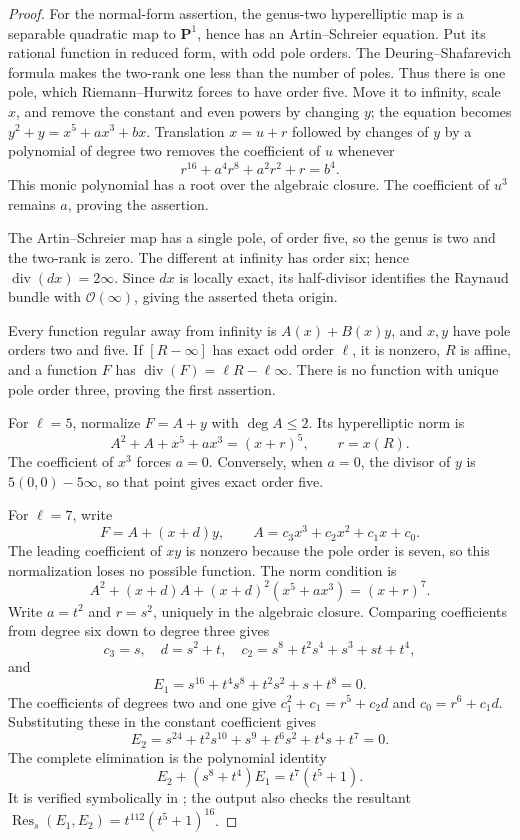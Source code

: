 \begin{proof}
For the normal-form assertion, the genus-two hyperelliptic
map is a separable quadratic map to $\mathbf P^1$, hence
has an Artin--Schreier equation. Put its rational function
in reduced form, with odd pole orders. The
Deuring--Shafarevich formula makes the two-rank one less
than the number of poles. Thus there is one pole, which
Riemann--Hurwitz forces to have order five. Move it to
infinity, scale $x$, and remove the constant and even
powers by changing $y$; the equation becomes
$y^2+y=x^5+a x^3+b x$. Translation $x=u+r$ followed
by changes of $y$ by a polynomial of degree two removes
the coefficient of $u$ whenever
\[
                   r^{16}+a^4r^8+a^2r^2+r=b^4.
\]
This monic polynomial has a root over the algebraic
closure. The coefficient of $u^3$ remains $a$,
proving the assertion.

The Artin--Schreier map has a single pole, of order five,
so the genus is two and the two-rank is zero. The different
at infinity has order six; hence $\operatorname{div}(dx)=2\infty$.
Since $dx$ is locally exact, its half-divisor identifies
the Raynaud bundle with $\mathcal O(\infty)$, giving
the asserted theta origin.

Every function regular away from infinity is
$A(x)+B(x)y$, and $x,y$ have pole orders two and five.
If $[R-\infty]$ has exact odd order $\ell$, it is nonzero,
$R$ is affine, and a function $F$ has
$\operatorname{div}(F)=\ell R-\ell\infty$.
There is no function with unique pole order three, proving
the first assertion.

For $\ell=5$, normalize $F=A+y$ with $\deg A\le2$.
Its hyperelliptic norm is
\[
             A^2+A+x^5+a x^3=(x+r)^5,\qquad r=x(R).
\]
The coefficient of $x^3$ forces $a=0$. Conversely,
when $a=0$, the divisor of $y$ is
$5(0,0)-5\infty$, so that point gives exact order five.

For $\ell=7$, write
\[
 F=A+(x+d)y,\qquad
 A=c_3x^3+c_2x^2+c_1x+c_0.
\]
The leading coefficient of $x y$ is nonzero because the
pole order is seven, so this normalization loses no
possible function. The norm condition is
\[
 A^2+(x+d)A+(x+d)^2(x^5+a x^3)=(x+r)^7.
\]
Write $a=t^2$ and $r=s^2$, uniquely in the algebraic
closure. Comparing coefficients from degree six down to
degree three gives
\[
 c_3=s,\quad d=s^2+t,\quad
 c_2=s^8+t^2s^4+s^3+st+t^4,
\]
and
\[
             E_1=s^{16}+t^4s^8+t^2s^2+s+t^8=0.
\]
The coefficients of degrees two and one give
$c_1^2+c_1=r^5+c_2d$ and $c_0=r^6+c_1d$.
Substituting these in the constant coefficient gives
\[
             E_2=s^{24}+t^2s^{10}+s^9+t^6s^2+t^4s+t^7=0.
\]
The complete elimination is the polynomial identity
\[
                     E_2+(s^8+t^4)E_1=t^7(t^5+1).
\]
It is verified symbolically in
; the output also
checks the resultant
$\operatorname{Res}_s(E_1,E_2)=t^{112}(t^5+1)^{16}$.


\end{proof}
